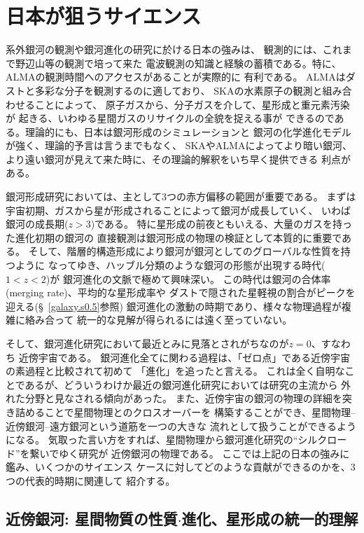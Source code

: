 \section{日本が狙うサイエンス}\label{galaxy.s3}

系外銀河の観測や銀河進化の研究に於ける日本の強みは、
観測的には、これまで野辺山等の観測で培って来た
電波観測の知識と経験の蓄積である。特に、
ALMAの観測時間へのアクセスがあることが実際的に
有利である。
ALMAはダストと多彩な分子を観測するのに適しており、
SKAの水素原子の観測と組み合わせることによって、
原子ガスから、分子ガスを介して、星形成と重元素汚染が
起きる、いわゆる星間ガスのリサイクルの全貌を捉える事が
できるのである。理論的にも、日本は銀河形成のシミュレーションと
銀河の化学進化モデルが強く、理論的予言は言うまでもなく、
SKAやALMAによってより暗い銀河、
より遠い銀河が見えて来た時に、その理論的解釈をいち早く提供できる
利点がある。

銀河形成研究においては、主として3つの赤方偏移の範囲が重要である。
まずは宇宙初期、ガスから星が形成されることによって銀河が成長していく、
いわば銀河の成長期($z > 3$)である。
特に星形成の前夜ともいえる、大量のガスを持った進化初期の銀河の
直接観測は銀河形成の物理の検証として本質的に重要である。
そして、階層的構造形成により銀河が銀河としてのグローバルな性質を持つように
なってゆき、ハッブル分類のような銀河の形態が出現する時代($1 < z < 2$)が
銀河進化の文脈で極めて興味深い。
この時代は銀河の合体率(merging rate)、平均的な星形成率や
ダストで隠された星軽視の割合がピークを迎える(\S~\ref{galaxy.s0.5}参照)
銀河進化の激動の時期であり、様々な物理過程が複雑に絡み合って
統一的な見解が得られるには遠く至っていない。

そして、銀河進化研究において最近とみに見落とされがちなのが$z=0$、すなわち
近傍宇宙である。
銀河進化全てに関わる過程は、「ゼロ点」である近傍宇宙の素過程と比較されて初めて
「進化」を追ったと言える。
これは全く自明なことであるが、どういうわけか最近の銀河進化研究においては研究の主流から
外れた分野と見なされる傾向があった。
また、近傍宇宙の銀河の物理の詳細を突き詰めることで星間物理とのクロスオーバーを
構築することができ、星間物理--近傍銀河--遠方銀河という道筋を一つの大きな
流れとして扱うことができるようになる。
気取った言い方をすれば、星間物理から銀河進化研究の``シルクロード''を繋いでゆく研究が
近傍銀河の物理である。
ここでは上記の日本の強みに鑑み、いくつかのサイエンス
ケースに対してどのような貢献ができるのかを、3つの代表的時期に関連して
紹介する。

\subsection{近傍銀河: 星間物質の性質$\cdot$進化、星形成の統一的理解}


